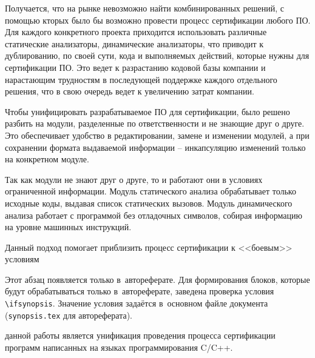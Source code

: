 Получается, что на рынке невозможно найти комбинированных решений, 
с помощью кторых было бы возможно провести процесс сертификации любого ПО. 
Для каждого конкретного проекта приходится использовать различные статические анализаторы, 
динамические анализаторы, что приводит к дублированию, по своей сути, кода и выполняемых действий, которые нужны для сертификации ПО.
Это ведет к разрастанию кодовой базы компании и нарастающим трудностям в последующей поддержке
каждого отдельного решения, что в свою очередь ведет к увеличению затрат компании.

Чтобы унифицировать разрабатываемое ПО для сертификации, было решено разбить {\ProgModule}
на модули, разделенные по ответственности и не знающие друг о друге. Это обеспечивает
удобство в редактировании, замене и изменении модулей, а при сохранении формата выдаваемой информации
 -- инкапсуляцию изменений только на конкретном модуле.

Так как модули не знают друг о друге, то и работают они в условиях ограниченной информации.
Модуль статического анализа обрабатывает только исходные коды, выдавая список статических
вызовов. Модуль динамического анализа работает с программой без отладочных символов,
собирая информацию на уровне машинных инструкций.

Данный подход помогает приблизить процесс сертификации к <<боевым>> условиям

\ifsynopsis
Этот абзац появляется только в~автореферате.
Для формирования блоков, которые будут обрабатываться только в~автореферате,
заведена проверка условия \verb!\!\verb!ifsynopsis!.
Значение условия задаётся в~основном файле документа (\verb!synopsis.tex! для
автореферата).
\else
\fi


{\aim} данной работы является унификация проведения процесса сертификации
программ написанных на языках программирования C/C++.


